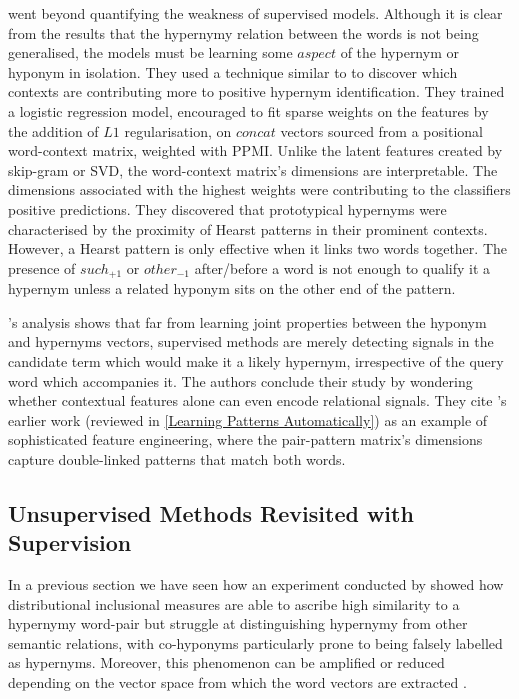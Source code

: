 \citeauthor{levy2015supervised} went beyond quantifying the weakness of supervised models.  Although it is clear from the results that the hypernymy relation between the words is not being generalised, the models must be learning some $aspect$ of the hypernym or hyponym in isolation.  They used a technique similar to \citep{roller2014inclusive} to discover which contexts are contributing more to positive hypernym identification.  They trained a logistic regression model, encouraged to fit sparse weights on the features by the addition of $L1$ regularisation, on $concat$ vectors sourced from a positional word-context matrix, weighted with \ac{PPMI}.  Unlike the latent features created by skip-gram or \ac{SVD}, the word-context matrix’s dimensions are interpretable.  The dimensions associated with the highest weights were contributing to the classifiers positive predictions.  They discovered that prototypical hypernyms were characterised by the proximity of Hearst patterns \citep{hearst1992automatic} in their prominent contexts.  However, a Hearst pattern is only effective when it links two words together.  The presence of $such_{+1}$ or $other_{-1}$ after/before a word is not enough to qualify it a hypernym unless a related hyponym sits on the other end of the pattern.

\citeauthor{levy2015supervised}'s analysis shows that far from learning joint properties between the hyponym and hypernyms vectors, supervised methods are merely detecting signals in the candidate term which would make it a likely hypernym, irrespective of the query word which accompanies it.  The authors conclude their study by wondering whether contextual features alone can even encode relational signals.  They cite \citeauthor{Snow2004}'s earlier work \citep{Snow2004} (reviewed in \ref{Learning Patterns Automatically}) as an example of sophisticated feature engineering, where the pair-pattern matrix’s dimensions capture double-linked patterns that match both words.

\subsection{Unsupervised Methods Revisited with Supervision}
In a previous section we have seen how an experiment conducted by \citeauthor{roller2014inclusive} showed how distributional inclusional measures are able to ascribe high similarity to a hypernymy word-pair but struggle at distinguishing hypernymy from other semantic relations, with co-hyponyms particularly prone to being falsely labelled as hypernyms.  Moreover, this phenomenon can be amplified or reduced depending on the vector space from which the word vectors are extracted \citep{roller2014inclusive}.

